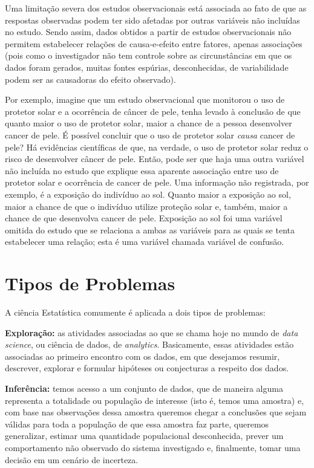 \documentclass[
]{book}
\theoremstyle{definition}
\theoremstyle{definition}
\theoremstyle{definition}
\theoremstyle{remark}
\begin{document}
Uma limitação severa dos estudos observacionais está associada ao fato de que as respostas observadas podem ter sido afetadas por outras variáveis não incluídas no estudo. Sendo assim, dados obtidos a partir de estudos observacionais não permitem estabelecer relações de causa-e-efeito entre fatores, apenas associações (pois como o investigador não tem controle sobre as circunstâncias em que os dados foram gerados, muitas fontes espúrias, desconhecidas, de variabilidade podem ser as causadoras do efeito observado).

Por exemplo, imagine que um estudo observacional que monitorou o uso de protetor solar e a ocorrência de câncer de pele, tenha levado à conclusão de que quanto maior o uso de protetor solar, maior a chance de a pessoa desenvolver cancer de pele. É possível concluir que o uso de protetor solar \emph{causa} cancer de pele? Há evidências científicas de que, na verdade, o uso de protetor solar reduz o risco de desenvolver câncer de pele. Então, pode ser que haja uma outra variável não incluída no estudo que explique essa aparente associação entre uso de protetor solar e ocorrência de cancer de pele. Uma informação não registrada, por exemplo, é a exposição do indivíduo ao sol. Quanto maior a exposição ao sol, maior a chance de que o indivíduo utilize proteção solar e, também, maior a chance de que desenvolva cancer de pele. Exposição ao sol foi uma variável omitida do estudo que se relaciona a ambas as variáveis para as quais se tenta estabelecer uma relação; esta é uma variável chamada variável de confusão.

\hypertarget{tipos-de-problemas}{%
\section{Tipos de Problemas}\label{tipos-de-problemas}}

A ciência Estatística comumente é aplicada a dois tipos de problemas:

\textbf{Exploração:} as atividades associadas ao que se chama hoje no mundo de \emph{data science}, ou ciência de dados, de \emph{analytics}. Basicamente, essas atividades estão associadas ao primeiro encontro com os dados, em que desejamos resumir, descrever, explorar e formular hipóteses ou conjecturas a respeito dos dados.

\textbf{Inferência:} temos acesso a um conjunto de dados, que de maneira alguma representa a totalidade ou população de interesse (isto é, temos uma amostra) e, com base nas observações dessa amostra queremos chegar a conclusões que sejam válidas para toda a população de que essa amostra faz parte, queremos generalizar, estimar uma quantidade populacional desconhecida, prever um comportamento não observado do sistema investigado e, finalmente, tomar uma decisão em um cenário de incerteza.
\end{document}
